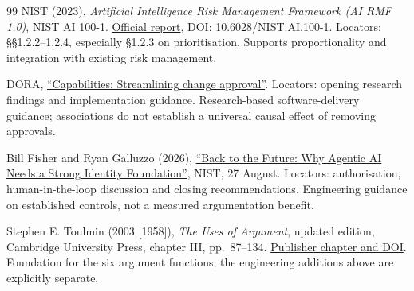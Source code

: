 \documentclass[11pt,a4paper]{article}
\begin{document}
\begin{thebibliography}{99}
NIST (2023), \emph{Artificial Intelligence Risk Management Framework (AI RMF 1.0)}, NIST AI 100-1. \href{https://nvlpubs.nist.gov/nistpubs/ai/NIST.AI.100-1.pdf}{Official report}, DOI: 10.6028/NIST.AI.100-1. Locators: §§1.2.2--1.2.4, especially §1.2.3 on prioritisation. Supports proportionality and integration with existing risk management.

DORA, \href{https://dora.dev/capabilities/streamlining-change-approval/}{``Capabilities: Streamlining change approval''}. Locators: opening research findings and implementation guidance. Research-based software-delivery guidance; associations do not establish a universal causal effect of removing approvals.

Bill Fisher and Ryan Galluzzo (2026), \href{https://www.nist.gov/blogs/cybersecurity-insights/back-future-why-agentic-ai-needs-strong-identity-foundation}{``Back to the Future: Why Agentic AI Needs a Strong Identity Foundation''}, NIST, 27 August. Locators: authorisation, human-in-the-loop discussion and closing recommendations. Engineering guidance on established controls, not a measured argumentation benefit.

Stephen E. Toulmin (2003 {[}1958{]}), \emph{The Uses of Argument}, updated edition, Cambridge University Press, chapter III, pp.~87--134. \href{https://www.cambridge.org/core/books/abs/uses-of-argument/layout-of-arguments/0CF09834F2802518330E754858CC0655}{Publisher chapter and DOI}. Foundation for the six argument functions; the engineering additions above are explicitly separate.
\end{thebibliography}
\end{document}
